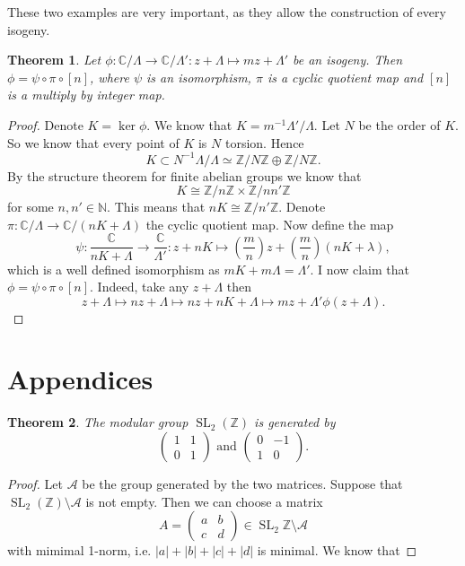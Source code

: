\documentclass[a4paper]{article}
\theoremstyle{theoremdd}
\newtheorem{theorem}{Theorem}[section]
\theoremstyle{definitiondd}
\theoremstyle{remarkdd}
\newcommand{\N}{\mathbb{N}}
\newcommand{\Z}{\mathbb{Z}}
\newcommand{\C}{\mathbb{C}}
\DeclareMathOperator{\SL}{SL}
\begin{document}
These two examples are very important, as they allow the construction of every isogeny. 
\begin{theorem}
	Let $\phi: \C / \Lambda \to \C / \Lambda': z + \Lambda \mapsto mz + \Lambda'$ be an isogeny. Then $\phi = \psi \circ \pi \circ [n]$, where  $\psi$ is an isomorphism, $\pi$ is a cyclic quotient map and $[n]$ is a multiply by integer map.
\end{theorem}
\begin{proof}
	Denote $K = \ker \phi$. We know that $K = m^{-1} \Lambda' / \Lambda$.
	Let $N$ be the order of $K$. So we know that every point of $K$ is $N$ torsion. 
	Hence \[
		K \subset N^{-1} \Lambda / \Lambda \simeq \Z / N \Z \oplus \Z / N \Z. 
	\]
	By the structure theorem for finite abelian groups we know that  \[
	K \cong \Z / n \Z \times \Z / n n' \Z
	\]
	for some $n, n'\in \N$. 
	This means that $nK \cong \Z / n' \Z$. Denote $\pi: \C / \Lambda \to \C / (nK + \Lambda)$ the cyclic quotient map. Now define the map \[
		\psi: \frac{\C}{nK + \Lambda} \to \frac{\C}{\Lambda'}: z + nK \mapsto  \left(\frac{m}{n}\right) z + \left( \frac{m}{n} \right)(nK + \lambda)
	,\] 
	which is a well defined isomorphism as $mK + m\Lambda = \Lambda'$. 
	I now claim that $\phi = \psi \circ \pi \circ [n]$. Indeed, take any $z + \Lambda$ then \[
		z + \Lambda \mapsto nz + \Lambda \mapsto  nz + nK + \Lambda \mapsto  mz + \Lambda' \phi(z + \Lambda)
	.\]  
\end{proof}
\section{Appendices}
\begin{theorem}
	The modular group $\SL_2(\Z)$ is generated by \[ 	
	\begin{pmatrix}  1 & 1 \\ 0 & 1 \end{pmatrix} 
	\text{ and }
	\begin{pmatrix} 0 & -1 \\ 1 & 0 \end{pmatrix} 
.\] 
\end{theorem}
\begin{proof}
	Let $\mathcal{A} $ be the group generated by the two matrices. 
	Suppose that $\SL_2(\Z) \setminus \mathcal{A} $ is not empty.
	Then we can choose a matrix \[
		A =\begin{pmatrix} a & b \\ c& d\end{pmatrix} \in \SL_2\Z \setminus \mathcal{A} 
	\] 
	with mimimal 1-norm, i.e. $|a| + |b| + |c| + |d|$ is minimal.
	We know that 
\end{proof}
\end{document}
